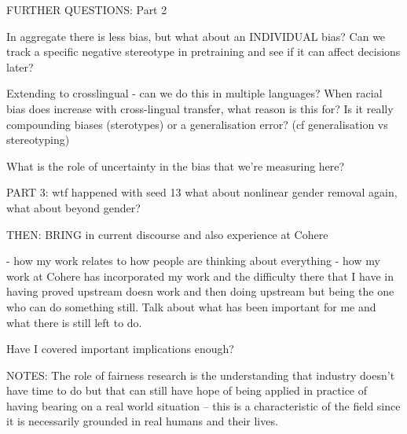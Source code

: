 FURTHER QUESTIONS:
Part 2

In aggregate there is less bias, but what about an INDIVIDUAL bias? Can we track a specific negative stereotype in pretraining and see if it can affect decisions later?

Extending to crosslingual - can we do this in multiple languages? When racial bias does increase with cross-lingual transfer, what reason is this for? Is it really compounding biases (sterotypes) or a generalisation error? (cf generalisation vs stereotyping)

What is the role of uncertainty in the bias that we're measuring here?


PART 3:
wtf happened with seed 13
what about nonlinear gender removal
again, what about beyond gender?



THEN:
BRING in current discourse and also experience at Cohere

- how my work relates to how people are thinking about everything
- how my work at Cohere has incorporated my work and the difficulty there that I have in having proved upstream doesn work and then doing upstream but being the one who can do something still. 
Talk about what has been important for me and what there is still left to do. 

Have I covered important implications enough?


NOTES:
The role of fairness research is the understanding that industry doesn't have time to do but that can still have hope of being applied in practice of having bearing on a real world situation -- this is a characteristic of the field since it is necessarily grounded in real humans and their lives.








